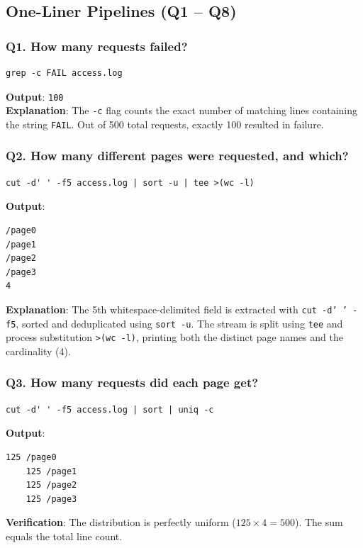 \documentclass[12pt,a4paper]{article}
\begin{document}
\subsection{One-Liner Pipelines (Q1 -- Q8)}

\subsubsection*{Q1. How many requests failed?}
\begin{lstlisting}[style=bashstyle]
grep -c FAIL access.log
\end{lstlisting}
\textbf{Output}: \texttt{100} \\
\textbf{Explanation}: The \texttt{-c} flag counts the exact number of matching lines containing the string \texttt{FAIL}. Out of 500 total requests, exactly 100 resulted in failure.

\subsubsection*{Q2. How many different pages were requested, and which?}
\begin{lstlisting}[style=bashstyle]
cut -d' ' -f5 access.log | sort -u | tee >(wc -l)
\end{lstlisting}
\textbf{Output}:
\begin{lstlisting}[style=consolestyle]
/page0
/page1
/page2
/page3
4
\end{lstlisting}
\textbf{Explanation}: The 5th whitespace-delimited field is extracted with \texttt{cut -d' ' -f5}, sorted and deduplicated using \texttt{sort -u}. The stream is split using \texttt{tee} and process substitution \texttt{>(wc -l)}, printing both the distinct page names and the cardinality (4).

\subsubsection*{Q3. How many requests did each page get?}
\begin{lstlisting}[style=bashstyle]
cut -d' ' -f5 access.log | sort | uniq -c
\end{lstlisting}
\textbf{Output}:
\begin{lstlisting}[style=consolestyle]
    125 /page0
    125 /page1
    125 /page2
    125 /page3
\end{lstlisting}
\textbf{Verification}: The distribution is perfectly uniform ($125 \times 4 = 500$). The sum equals the total line count.
\end{document}
